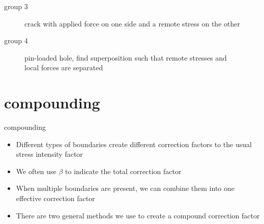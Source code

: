 \documentclass[10pt]{beamer}
\begin{document}
\begin{frame}{group 3}
	\begin{figure}
		\centering
	\caption{crack with applied force on one side and a remote stress on the other}
	\end{figure}
\end{frame}

\begin{frame}{group 4}
	\begin{figure}
		\caption{pin-loaded hole, find superposition such that remote stresses and local forces are separated}
	\end{figure}
\end{frame}

\section{compounding}

\begin{frame}{compounding}
	\begin{itemize}
		\item Different types of boundaries create different correction factors to the usual stress intensity factor
		\item We often use $\beta$ to indicate the total correction factor
		\item When multiple boundaries are present, we can combine them into one effective correction factor
		\item There are two general methods we use to create a compound correction factor
	\end{itemize}
\end{frame}
\end{document}
